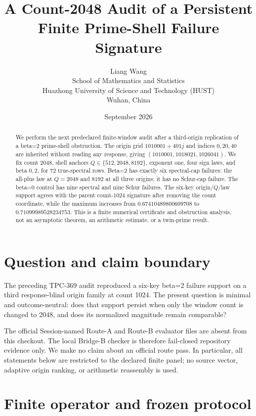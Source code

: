 \documentclass[10pt]{article}
\title{A Count-2048 Audit of a Persistent Finite Prime-Shell Failure Signature}
\author{Liang Wang\\
\small School of Mathematics and Statistics\\
\small Huazhong University of Science and Technology (HUST)\\
\small Wuhan, China}
\date{September 2026}
\begin{document}
\maketitle

\begin{abstract}
We perform the next predeclared finite-window audit after a third-origin
replication of a beta=2 prime-shell obstruction.  The origin grid
$1010001+401j$ and indices $0,20,40$ are inherited without reading any
response, giving $(1010001,1018021,1026041)$.  We fix count $2048$, shell
anchors $Q\in\{512,2048,8192\}$, exponent one, four sign laws, and beta
$0,2$, for 72 true-spectral rows.  Beta=2 has exactly six spectral-cap
failures: the all-plus law at $Q=2048$ and $8192$ at all three origins; it
has no Schur-cap failure.  The beta=0 control has nine spectral and nine
Schur failures.  The six-key origin/$Q$/law support agrees with the parent
count-1024 signature after removing the count coordinate, while the maximum
increases from $0.67410489800609708$ to $0.71099989528234753$.  This is a
finite numerical certificate and obstruction analysis, not an asymptotic
theorem, an arithmetic estimate, or a twin-prime result.
\end{abstract}

\section{Question and claim boundary}

The preceding TPC-369 audit reproduced a six-key beta=2 failure support on a
third response-blind origin family at count 1024.  The present question is
minimal and outcome-neutral: does that support persist when only the window
count is changed to 2048, and does its normalized magnitude remain comparable?

The official Session-named Route-A and Route-B evaluator files are absent from
this checkout.  The local Bridge-B checker is therefore fail-closed repository
evidence only.  We make no claim about an official route pass.  In particular,
all statements below are restricted to the declared finite panel; no source
vector, adaptive origin ranking, or arithmetic reassembly is used.

\section{Finite operator and frozen protocol}
\end{document}

